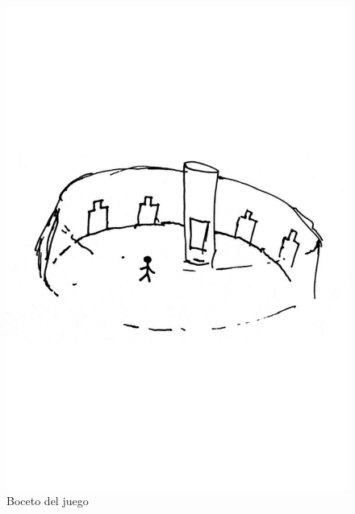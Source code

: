 \begin{figure}[H]
  \centering
  \includegraphics[scale=0.35, trim={0 9cm 0 9cm}]{imagenes/hall_juego}
  \caption{Boceto del juego}
  \label{fig:hall}
\end{figure}

